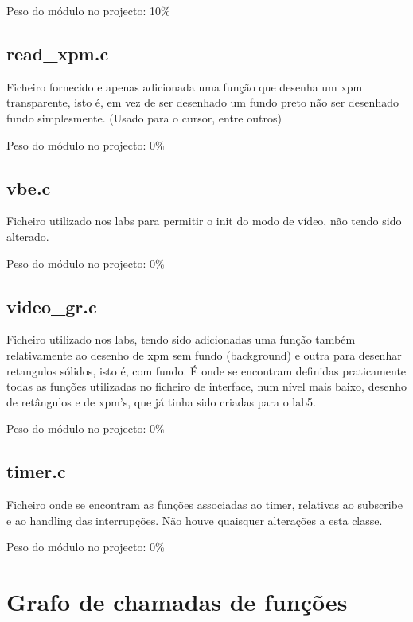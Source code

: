 \documentclass[a4paper]{article}
\begin{document}
Peso do módulo no projecto: 10\%



\subsection{read\_xpm.c}

Ficheiro fornecido e apenas adicionada uma função que desenha um xpm transparente, isto é, em vez de ser desenhado um fundo preto não ser desenhado fundo simplesmente. (Usado para o cursor, entre outros)\bigskip

Peso do módulo no projecto: 0\%


\subsection{vbe.c}

Ficheiro utilizado nos labs para permitir o init do modo de vídeo, não tendo sido alterado.\bigskip

Peso do módulo no projecto: 0\%

\subsection{video\_gr.c}

Ficheiro utilizado nos labs, tendo sido adicionadas uma função também relativamente ao desenho de xpm sem fundo (background) e outra para desenhar retangulos sólidos, isto é, com fundo. É onde se encontram definidas praticamente todas as funções utilizadas no ficheiro de interface, num nível mais baixo, desenho de retângulos e de xpm's, que já tinha sido criadas para o lab5.\bigskip 

Peso do módulo no projecto: 0\%


\subsection{timer.c}        
 
Ficheiro onde se encontram as funções associadas ao timer, relativas ao subscribe e ao handling das interrupções. Não houve quaisquer alterações a esta classe. \bigskip

Peso do módulo no projecto: 0\%

 
\newpage
\section{Grafo de chamadas de funções}\bigskip\FloatBarrier
\end{document}
